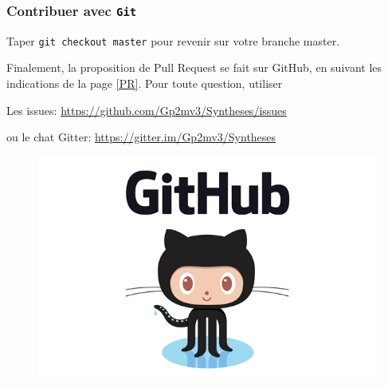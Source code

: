 \documentclass{beamer}
\newenvironment{wideitemize}{\itemize\addtolength{\itemsep}{10pt}}{\enditemize}
\begin{document}
\begin{frame}
    \frametitle{Contribuer avec \texttt{Git}}
    \begin{wideitemize}
         \item Taper \lstinline[mathescape]|git checkout master| pour revenir sur votre branche master.
         \item Finalement, la proposition de Pull Request se fait sur GitHub, en suivant les indications de la page \ref{PR}.
     \end{wideitemize}
Pour toute question, utiliser 
    \begin{wideitemize}
         \item Les issues: \url{https://github.com/Gp2mv3/Syntheses/issues}
         \item ou le chat Gitter: \url{https://gitter.im/Gp2mv3/Syntheses}
     \end{wideitemize}
    \begin{figure}[H]
        \centering
        \includegraphics[width=0.3\linewidth]{github-logo.jpg}
    \end{figure}
\end{frame}
\end{document}
